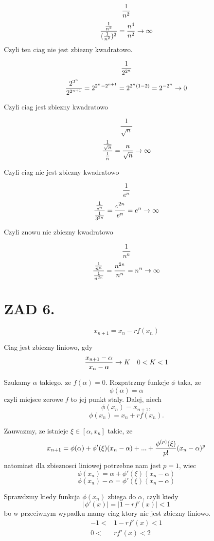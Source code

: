 \documentclass{article}[13pt]
\begin{document}
    $${1\over n^2}$$
    $${\frac1{n^2}\over (\frac1{n^2})^2}={n^4\over n^2}\to\infty$$
    Czyli ten ciag nie jest zbiezny kwadratowo.\medskip

    \medskip

    $${1\over2^{2^n}}$$
    $${2^{2^n}\over2^{2^{n+1}}}=2^{2^n-2^{n+1}}=2^{2^n(1-2)}=2^{-2^n}\to 0$$

    Czyli ciag jest zbiezny kwadratowo\medskip

    \medskip

    $$\frac1{\sqrt{n}}$$
    $${\frac1{\sqrt{n}}\over \frac1n}={n\over\sqrt{n}}\to\infty$$

    Czyli ciag nie jest zbiezny kwadratowo\medskip

    \medskip

    $${1\over e^n}$$
    $${{1\over e^n}\over {1\over 3^{2n}}}={e^{2n}\over e^n}=e^n\to\infty$$

    Czyli znowu nie zbiezny kwadratowo\medskip

    \medskip
    
    $$\frac1{n^n}$$
    $${\frac1{n^n}\over \frac1{n^{2n}}}={n^{2n}\over n^n}=n^n\to\infty$$

    \section*{ZAD 6.}

    $$x_{n+1}=x_n-rf(x_n)$$

    Ciag jest zbiezny liniowo, gdy 
    $${x_{n+1}-\alpha\over x_n-\alpha}\to K\quad 0<K<1$$

    Szukamy $\alpha$ takiego, ze $f(\alpha)=0$. Rozpatrzmy funkcje $\phi$ taka, ze
    $$\phi(\alpha)=\alpha$$
    czyli miejsce zerowe $f$ to jej punkt staly.
    Dalej, niech
    $$\phi(x_n)=x_{n+1},$$
    $$\phi(x_n)=x_n+rf(x_n).$$

    Zauwazmy, ze istnieje $\xi\in[\alpha,x_n]$ takie, ze
    $$x_{n+1}=\phi(\alpha)+\phi'(\xi)(x_n-\alpha)+...+{\phi^{(p)}(\xi)\over p!}(x_n-\alpha)^p$$
    natomiast dla zbieznosci liniowej potrzebne nam jest $p=1$, wiec
    $$\phi(x_n)=\alpha+\phi'(\xi)(x_n-\alpha)$$
    $$\phi(x_n)-\alpha=\phi'(\xi)(x_n-\alpha)$$

    Sprawdzmy kiedy funkcja $\phi(x_n)$ zbiega do $\alpha$, czyli kiedy
    $$|\phi'(x)|=|1-rf'(x)|<1$$
    bo w przeciwnym wypadku mamy ciag ktory nie jest zbiezny liniowo. 
    \begin{align*}
        -1<&1-rf'(x)<1\\
        0<&rf'(x)<2
    \end{align*}
    
\end{document}
